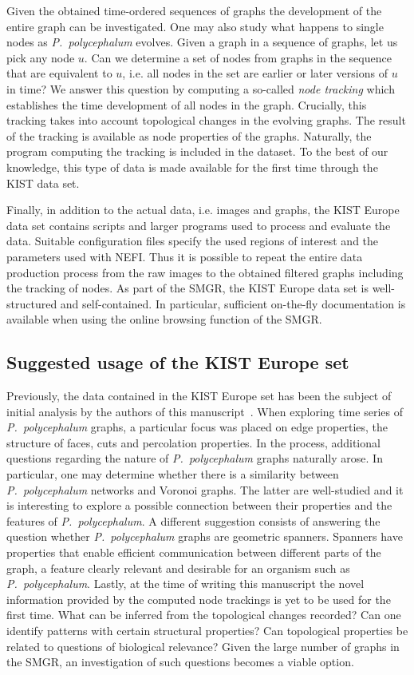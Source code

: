 	Given the obtained time-ordered sequences of graphs the development of the entire graph can be investigated. One may also study what happens to single nodes as \emph{P.~polycephalum} evolves. Given a graph in a sequence of graphs, let us pick any node $u$. Can we determine a set of nodes from graphs in the sequence that are equivalent to $u$, i.e. all nodes in the set are earlier or later versions of $u$ in time? We answer this question by computing a so-called \emph{node tracking} which establishes the time development of all nodes in the graph. Crucially, this tracking takes into account topological changes in the evolving graphs. The result of the tracking is available as node properties of the graphs. Naturally, the program computing the tracking is included in the dataset. To the best of our knowledge, this type of data is made available for the first time through the KIST data set.

	Finally, in addition to the actual data, i.e. images and graphs, the KIST Europe data set contains scripts and larger programs used to process and evaluate the data. Suitable configuration files specify the used regions of interest and the parameters used with NEFI. Thus it is possible to repeat the entire data production process from the raw images to the obtained filtered graphs including the tracking of nodes. As part of the SMGR, the KIST Europe data set is well-structured and self-contained. In particular, sufficient on-the-fly documentation is available when using the online browsing function of the SMGR.

	\subsection{Suggested usage of the KIST Europe set}

		Previously, the data contained in the KIST Europe set has been the subject of initial analysis by the authors of this manuscript~\cite{dirnberger2016}. When exploring time series of \emph{P.~polycephalum} graphs, a particular focus was placed on edge properties, the structure of faces, cuts and percolation properties. In the process, additional questions regarding the nature of \emph{P.~polycephalum} graphs naturally arose. In particular, one may determine whether there is a similarity between \emph{P.~polycephalum} networks and Voronoi graphs. The latter are well-studied and it is interesting to explore a possible connection between their properties and the features of \emph{P.~polycephalum}. A different suggestion consists of answering the question whether \emph{P.~polycephalum} graphs are geometric spanners. Spanners have properties that enable efficient communication between different parts of the graph, a feature clearly relevant and desirable for an organism such as \emph{P.~polycephalum}. Lastly, at the time of writing this manuscript the novel information provided by the computed node trackings is yet to be used for the first time. What can be inferred from the topological changes recorded? Can one identify patterns with certain structural properties? Can topological properties be related to questions of biological relevance? Given the large number of graphs in the SMGR, an investigation of such questions becomes a viable option.
		
